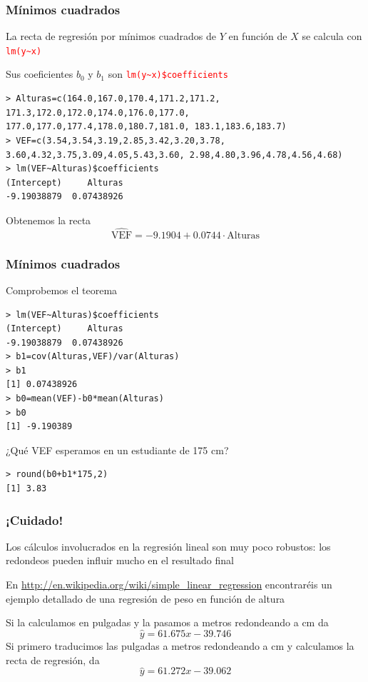 \documentclass[12pt,t]{beamer}
\newcommand{\red}[1]{\textcolor{red}{#1}}
\newcommand{\blue}[1]{\textcolor{blue}{#1}}
\theoremstyle{plain}
\theoremstyle{definition}
\begin{document}
\begin{frame}[fragile]
\frametitle{Mínimos cuadrados}

La recta de regresión por mínimos cuadrados de $Y$ en función de $X$ se calcula con \red{\tt lm(y\~{}x)}\medskip

Sus coeficientes $b_0$ y $b_1$ son \red{\tt lm(y\~{}x)\$coefficients}\medskip

\begin{lstlisting}
> Alturas=c(164.0,167.0,170.4,171.2,171.2, 171.3,172.0,172.0,174.0,176.0,177.0, 177.0,177.0,177.4,178.0,180.7,181.0, 183.1,183.6,183.7)
> VEF=c(3.54,3.54,3.19,2.85,3.42,3.20,3.78, 3.60,4.32,3.75,3.09,4.05,5.43,3.60, 2.98,4.80,3.96,4.78,4.56,4.68)
> lm(VEF~Alturas)$coefficients
(Intercept)     Alturas 
-9.19038879  0.07438926 
\end{lstlisting}
Obtenemos la recta
$$
\widehat{\mbox{VEF}}=-9.1904+  0.0744\cdot \mbox{Alturas}
$$
\end{frame}

\begin{frame}[fragile]
\frametitle{Mínimos cuadrados}
Comprobemos el teorema\medskip

\begin{lstlisting}
> lm(VEF~Alturas)$coefficients
(Intercept)     Alturas 
-9.19038879  0.07438926 
> b1=cov(Alturas,VEF)/var(Alturas)
> b1
[1] 0.07438926
> b0=mean(VEF)-b0*mean(Alturas)
> b0
[1] -9.190389
\end{lstlisting}\medskip

¿Qué VEF esperamos en un estudiante de 175 cm?
\begin{lstlisting}
> round(b0+b1*175,2)
[1] 3.83
\end{lstlisting}


\end{frame}


\begin{frame} 
\frametitle{¡Cuidado!}

Los cálculos involucrados en la regresión lineal son muy poco robustos: los redondeos
pueden influir mucho en el resultado final
\bigskip

En \blue{\url{http://en.wikipedia.org/wiki/simple_linear_regression}} encontraréis un ejemplo detallado de una regresión de peso en función de altura
\medskip

Si la calculamos en pulgadas y la pasamos a metros redondeando a cm da 
$$
\widehat{y}=61.675x-39.746
$$
Si primero traducimos las pulgadas a metros redondeando a cm y calculamos la recta de regresión, da
$$
\widehat{y}=61.272x-39.062
$$




\end{frame}
\end{document}
